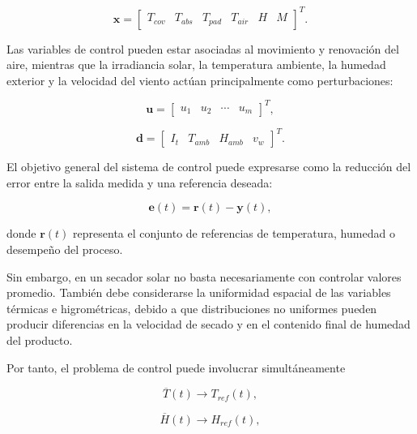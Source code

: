 \begin{equation}
\mathbf{x}
=
\begin{bmatrix}
T_{cov} &
T_{abs} &
T_{pad} &
T_{air} &
H &
M
\end{bmatrix}^{T}.
\end{equation}

Las variables de control pueden estar asociadas al movimiento y renovación del aire, mientras que la irradiancia solar, la temperatura ambiente, la humedad exterior y la velocidad del viento actúan principalmente como perturbaciones:

\begin{equation}
\mathbf{u}
=
\begin{bmatrix}
u_1 & u_2 & \cdots & u_m
\end{bmatrix}^{T},
\end{equation}

\begin{equation}
\mathbf{d}
=
\begin{bmatrix}
I_t &
T_{amb} &
H_{amb} &
v_w
\end{bmatrix}^{T}.
\end{equation}

El objetivo general del sistema de control puede expresarse como la reducción del error entre la salida medida y una referencia deseada:

\begin{equation}
\mathbf{e}(t)
=
\mathbf{r}(t)-\mathbf{y}(t),
\label{eq:error_control}
\end{equation}

donde $\mathbf{r}(t)$ representa el conjunto de referencias de temperatura, humedad o desempeño del proceso.

Sin embargo, en un secador solar no basta necesariamente con controlar valores promedio. También debe considerarse la uniformidad espacial de las variables térmicas e higrométricas, debido a que distribuciones no uniformes pueden producir diferencias en la velocidad de secado y en el contenido final de humedad del producto.

Por tanto, el problema de control puede involucrar simultáneamente

\begin{equation}
\overline{T}(t)
\rightarrow
T_{ref}(t),
\end{equation}

\begin{equation}
\overline{H}(t)
\rightarrow
H_{ref}(t),
\end{equation}

